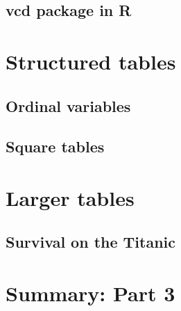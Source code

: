 \subsection{vcd package in R}


\section{Structured tables}
\subsection{Ordinal variables}

\subsection{Square tables}


\section{Larger tables}
\subsection{Survival on the Titanic}

\section{Summary: Part 3}

%

\endinput
